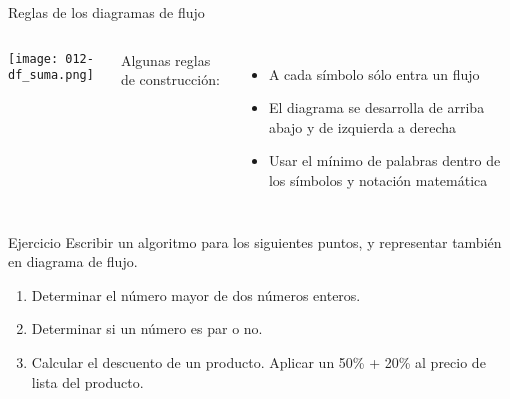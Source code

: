 \begin{frame}[c]{Reglas de los diagramas de flujo}
  \begin{columns}
      \begin{center}
        \texttt{[image: 012-df\_suma.png]}
      \end{center}
      Algunas reglas de construcción:
      \begin{itemize}
        \item A cada símbolo sólo entra un flujo
        \pausa
        \item El diagrama se desarrolla de arriba abajo y de izquierda a derecha
        \pausa
        \item Usar el mínimo de palabras dentro de los símbolos y notación matemática
      \end{itemize}
  \end{columns}
\end{frame}



\begin{frame}[c]{Ejercicio}
  Escribir un algoritmo para los siguientes puntos, y representar también en
  diagrama de flujo.
  \begin{enumerate}
    \item Determinar el número mayor de dos números enteros.
    \item Determinar si un número es par o no.
    \item Calcular el descuento de un producto. Aplicar un 50\% + 20\% al
      precio de lista del producto.
  \end{enumerate}
\end{frame}

